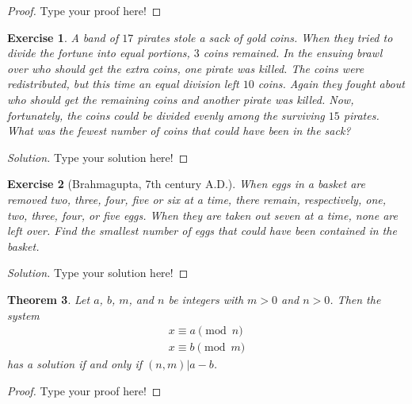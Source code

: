 \documentclass[11pt,leqno]{article}
\newtheorem{thm}{Theorem}[section]
\newtheorem{exer}[thm]{Exercise}
\theoremstyle{definition}
\begin{document}
\begin{proof}[Proof]
Type your proof here!
\end{proof}




\begin{exer}
A band of $17$ pirates stole a sack of gold coins.  When they tried
to divide the fortune into equal portions, $3$ coins remained.  In
the ensuing brawl over who should get the extra coins, one pirate
was killed.  The coins were redistributed, but this time an equal
division left $10$ coins.  Again they fought about who should get
the remaining coins and another pirate was killed.  Now,
fortunately, the coins could be divided evenly among the surviving
$15$ pirates.  What was the fewest number of coins that could have
been in the sack?
\end{exer}

\begin{proof}[Solution]
Type your solution here!
\end{proof}



\begin{exer}[Brahmagupta, 7th century A.D.]
When eggs in a basket are removed two, three, four, five or six at a
time, there remain, respectively, one, two, three, four, or five
eggs.  When they are taken out seven at a time, none are left over.
Find the smallest number of eggs that could have been contained in
the basket.
\end{exer}

\begin{proof}[Solution]
Type your solution here!
\end{proof}



\begin{thm}
Let $a$, $b$, $m$, and $n$ be integers with $m > 0$ and $n > 0$.
Then the system
\[ \begin{array}{l}
x \equiv a \pmod{n} \\
x \equiv b \pmod{m} \end{array} \] has a solution if and only if
$(n, m)| a - b$.
\end{thm}

\begin{proof}[Proof]
Type your proof here!
\end{proof}
\end{document}
